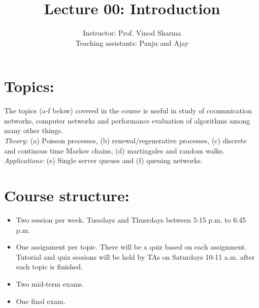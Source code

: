 \documentclass[a4paper,10pt,english]{article}
\title{Lecture 00: Introduction}
\author{Instructor: Prof. Vinod Sharma \\ Teaching assistants: Panju and Ajay}
\begin{document}
\maketitle
\section*{Topics:} 
The topics (a-f below) covered in the course is useful in study of coomunication networks, computer networks and performance evaluation of algorithms among many other things. \\

\textit{Theory:} (a) Poisson processes, (b) renewal/regenerative processes, (c) discrete and continous time Markov chains, (d) martingales and random walks. \\
\indent \textit{Applications:} (e) Single server  queues and (f) queuing networks. \\
\section*{Course structure:}
\begin{itemize}
\item Two session per week. Tuesdays and Thusrdays between 5:15 p.m. to 6:45 p.m.
\item One assignment per topic. There will be a quiz based on each assignment. Tutorial and quiz sessions will be held by TAs on Saturdays 10-11 a.m. after each topic is finished.
\item Two mid-term exams.
\item One final exam.
\end{itemize}
\end{document}
